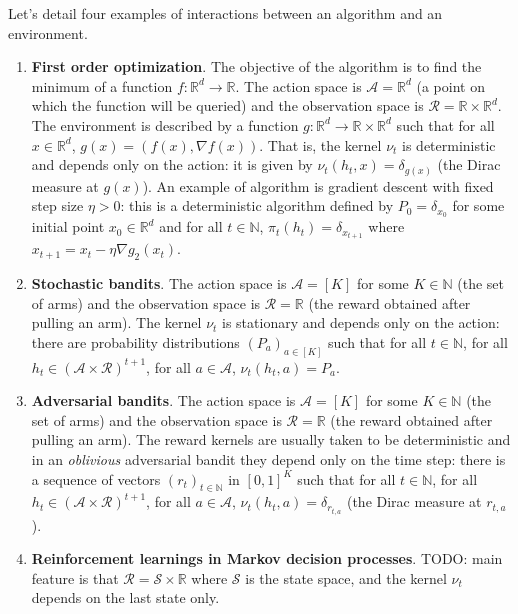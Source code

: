 Let's detail four examples of interactions between an algorithm and an environment.
\begin{enumerate}
  \item \textbf{First order optimization}. The objective of the algorithm is to find the minimum of a function $f : \mathbb{R}^d \to \mathbb{R}$.
  The action space is $\mathcal{A} = \mathbb{R}^d$ (a point on which the function will be queried) and the observation space is $\mathcal{R} = \mathbb{R} \times \mathbb{R}^d$.
  The environment is described by a function $g : \mathbb{R}^d \to \mathbb{R} \times \mathbb{R}^d$ such that for all $x \in \mathbb{R}^d$, $g(x) = (f(x), \nabla f(x))$. That is, the kernel $\nu_t$ is deterministic and depends only on the action: it is given by $\nu_t(h_t, x) = \delta_{g(x)}$ (the Dirac measure at $g(x)$).
  An example of algorithm is gradient descent with fixed step size $\eta > 0$: this is a deterministic algorithm defined by $P_0 = \delta_{x_0}$ for some initial point $x_0 \in \mathbb{R}^d$ and for all $t \in \mathbb{N}$, $\pi_t(h_t) = \delta_{x_{t+1}}$ where $x_{t+1} = x_t - \eta \nabla g_2(x_t)$.

  \item \textbf{Stochastic bandits}. The action space is $\mathcal{A} = [K]$ for some $K \in \mathbb{N}$ (the set of arms) and the observation space is $\mathcal{R} = \mathbb{R}$ (the reward obtained after pulling an arm).
  The kernel $\nu_t$ is stationary and depends only on the action: there are probability distributions $(P_a)_{a \in [K]}$ such that for all $t \in \mathbb{N}$, for all $h_t \in (\mathcal{A} \times \mathcal{R})^{t+1}$, for all $a \in \mathcal{A}$, $\nu_t(h_t, a) = P_a$.

  \item \textbf{Adversarial bandits}. The action space is $\mathcal{A} = [K]$ for some $K \in \mathbb{N}$ (the set of arms) and the observation space is $\mathcal{R} = \mathbb{R}$ (the reward obtained after pulling an arm).
  The reward kernels are usually taken to be deterministic and in an \emph{oblivious} adversarial bandit they depend only on the time step: there is a sequence of vectors $(r_t)_{t \in \mathbb{N}}$ in $[0,1]^K$ such that for all $t \in \mathbb{N}$, for all $h_t \in (\mathcal{A} \times \mathcal{R})^{t+1}$, for all $a \in \mathcal{A}$, $\nu_t(h_t, a) = \delta_{r_{t,a}}$ (the Dirac measure at $r_{t,a}$).

  \item \textbf{Reinforcement learnings in Markov decision processes}.
  TODO: main feature is that $\mathcal{R} = \mathcal{S} \times \mathbb{R}$ where $\mathcal{S}$ is the state space, and the kernel $\nu_t$ depends on the last state only.
\end{enumerate}


